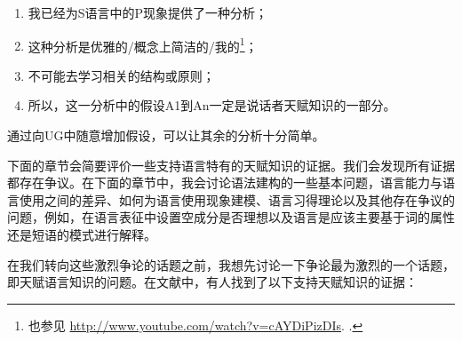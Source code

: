 \begin{enumerate}
\item 我已经为S语言中的P现象提供了一种分析；
\item 这种分析是优雅的/概念上简洁的/我的\footnote{
    也参见
    \url{http://www.youtube.com/watch?v=cAYDiPizDIs}. .\nocite{Zappa86a}
}；
\item 不可能去学习相关的结构或原则；
\item 所以，这一分析中的假设A1到An一定是说话者天赋知识的一部分。
\end{enumerate}
通过向UG中随意增加假设，可以让其余的分析十分简单。

下面的章节会简要评价一些支持语言特有的天赋知识的证据。我们会发现所有证据都存在争议。在下面的章节中，我会讨论语法建构的一些基本问题，语言能力与语言使用之间的差异、如何为语言使用现象建模、语言习得理论以及其他存在争议的问题，例如，在语言表征中设置空成分是否理想以及语言是应该主要基于词的属性还是短语的模式进行解释。

在我们转向这些激烈争论的话题之前，我想先讨论一下争论最为激烈的一个话题，即天赋语言知识的问题。在文献中，有人找到了以下支持天赋知识的证据：

